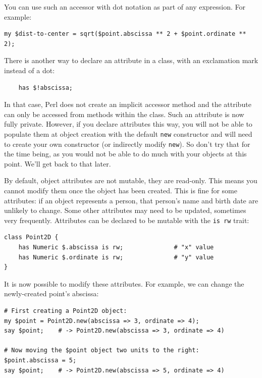 You can use such an accessor with dot notation as part of any 
expression. For example:

\begin{verbatim}
my $dist-to-center = sqrt($point.abscissa ** 2 + $point.ordinate ** 2);
\end{verbatim}
%

There is another way to declare an attribute in a class, with 
an exclamation mark instead of a dot:

\begin{verbatim}
    has $!abscissa;  
\end{verbatim}
%
In that case, Perl does not create an implicit accessor method 
and the attribute can only be accessed from methods within 
the class. Such an attribute is now fully private. 
However, if you declare attributes this way, you 
will not be able to populate them at object creation with 
the default {\tt new} constructor and will need to create your 
own constructor (or indirectly modify {\tt new}). So don't try 
that for the time being, as you would not be able to do much 
with your objects at this point. We'll get back to that later.

By default, object attributes are not mutable, they are read-only. 
This means you cannot modify them once the object has been created. 
This is fine for some attributes: if an object represents a 
person, that person's name and birth date are unlikely to 
change. Some other attributes may need to be updated, sometimes 
very frequently. Attributes can be declared to be mutable 
with the {\tt is rw} trait:

\begin{verbatim}
class Point2D {
    has Numeric $.abscissa is rw;              # "x" value
    has Numeric $.ordinate is rw;              # "y" value
}
\end{verbatim}
%
It is now possible to modify these attributes. For example, 
we can change the newly-created point's abscissa:

\begin{verbatim}
# First creating a Point2D object:
my $point = Point2D.new(abscissa => 3, ordinate => 4);
say $point;    # -> Point2D.new(abscissa => 3, ordinate => 4)

# Now moving the $point object two units to the right:
$point.abscissa = 5; 
say $point;    # -> Point2D.new(abscissa => 5, ordinate => 4)
\end{verbatim}


